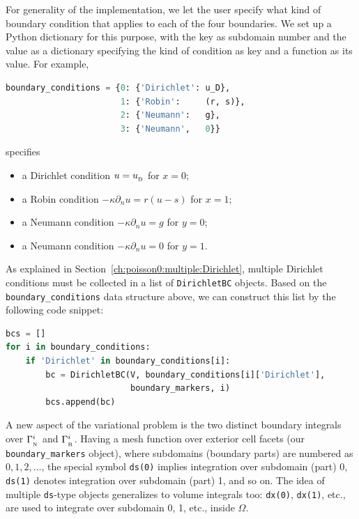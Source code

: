 \documentclass[graybox,envcountchap,sectrefs,final]{svmonodo}
\begin{document}
For generality of the implementation, we let the user specify
what kind of boundary condition that applies to each of the four
boundaries. We set up a Python dictionary for this purpose, with
the key as subdomain number and the value as a dictionary specifying
the kind of condition as key and a function as its value.
For example,

\begin{lstlisting}[language=Python,style=graycolor]
boundary_conditions = {0: {'Dirichlet': u_D},
                       1: {'Robin':     (r, s)},
                       2: {'Neumann':   g},
                       3: {'Neumann',   0}}
\end{lstlisting}
specifies

\begin{itemize}
 \item a Dirichlet condition $u = \ub$ for $x = 0$;

 \item a Robin condition $-\kappa\partial_n u = r(u-s)$ for $x = 1$;

 \item a Neumann condition $-\kappa\partial_n u = g$ for $y = 0$;

 \item a Neumann condition $-\kappa\partial_n u = 0$ for $y = 1$.
\end{itemize}

\noindent
As explained in Section~\ref{ch:poisson0:multiple:Dirichlet}, multiple
Dirichlet conditions must be collected in a list of \texttt{DirichletBC}
objects. Based on the \Verb!boundary_conditions! data structure above, we
can construct this list by the following code snippet:

\begin{lstlisting}[language=Python,style=graycolor]
bcs = []
for i in boundary_conditions:
    if 'Dirichlet' in boundary_conditions[i]:
        bc = DirichletBC(V, boundary_conditions[i]['Dirichlet'],
                         boundary_markers, i)
        bcs.append(bc)
\end{lstlisting}

A new aspect of the variational problem is the two distinct
boundary integrals over $\GN^i$ and $\GR^i$.
Having a mesh function over exterior cell facets (our
\Verb!boundary_markers! object), where subdomains (boundary parts) are
numbered as $0,1,2,\ldots$, the special symbol \texttt{ds(0)}
implies integration over subdomain (part) 0, \texttt{ds(1)} denotes
integration over subdomain (part) 1, and so on.
The idea of multiple \texttt{ds}-type objects generalizes to volume
integrals too: \texttt{dx(0)}, \texttt{dx(1)}, etc., are used to
integrate over subdomain 0, 1, etc.,  inside $\Omega$.
\end{document}
